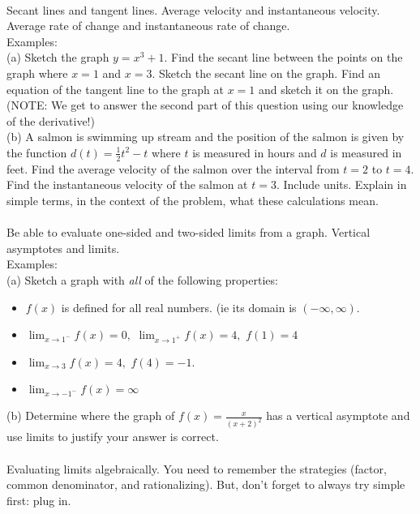 \documentclass[11pt,fleqn]{article}
\begin{document}
\noindent {}\\
Secant lines and tangent lines. Average velocity and instantaneous velocity. Average rate of change and instantaneous rate of change.\\

\noindent Examples: \\
(a) Sketch the graph $y=x^3+1.$ Find the secant line between the points on the graph where $x=1$ and $x=3.$ Sketch the secant line on the graph. Find an equation of the tangent line to the graph at $x=1$ and sketch it on the graph. (NOTE: We get to answer the second part of this question using our knowledge of the derivative!) \\
(b) A salmon is swimming up stream and the position of the salmon is given by the function $d(t)=\frac{1}{2}t^2-t$ where $t$ is measured in hours and $d$ is measured in feet. Find the average velocity of the salmon over the interval from $t=2$ to $t=4.$ Find the instantaneous velocity of the salmon at $t=3.$ Include units. Explain in simple terms, in the context of the problem, what these calculations mean.\\

\noindent {}\\
Be able to evaluate one-sided and two-sided limits from a graph. Vertical asymptotes and limits.\\

\noindent Examples: \\
(a) Sketch a graph with \emph{all} of the following properties: \\
\begin{itemize}
\item $f(x)$ is defined for all real numbers. (ie its domain is $(-\infty,\infty).$
\item $\lim_{x \to 1^-} f(x) = 0,$ $\lim_{x \to 1^+} f(x) =4,$ $f(1) =4$
\item $\lim_{x \to 3} f(x) =4,$ $f(4)=-1.$
\item $\lim_{x \to -1^-} f(x) =\infty$
\end{itemize}
(b) Determine where the graph of $f(x)=\frac{x}{(x+2)^2}$ has a vertical asymptote and use limits to justify your answer is correct. \\

\noindent {}\\
Evaluating limits algebraically. You need to remember the strategies (factor, common denominator, and rationalizing). But, don't forget to always try simple first: plug in. \\
\end{document}
